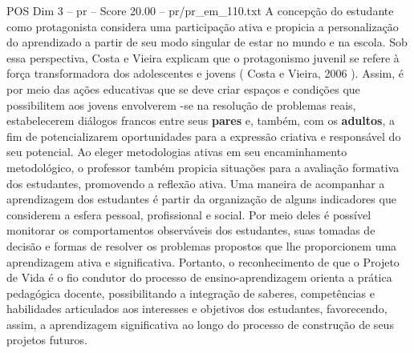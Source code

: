 \begin{textsample}{POS Dim 3 – pr – Score 20.00 – pr/pr\_em\_110.txt}
A concepção do estudante como protagonista considera uma participação ativa e propicia a personalização do aprendizado a partir de seu modo singular de estar no mundo e na escola.
Sob essa perspectiva, Costa e Vieira explicam que o protagonismo juvenil se refere à força transformadora dos adolescentes e jovens ( Costa e Vieira, 2006 ).
Assim, é por meio das ações educativas que se deve criar espaços e condições que possibilitem aos jovens envolverem -se na resolução de problemas reais, estabelecerem diálogos francos entre seus \textbf{pares} e, também, com os \textbf{adultos}, a fim de potencializarem oportunidades para a expressão criativa e responsável do seu potencial.
Ao eleger metodologias ativas em seu encaminhamento metodológico, o professor também propicia situações para a avaliação formativa dos estudantes, promovendo a reflexão ativa.
Uma maneira de acompanhar a aprendizagem dos estudantes é partir da organização de alguns indicadores que considerem a esfera pessoal, profissional e social.
Por meio deles é possível monitorar os comportamentos observáveis dos estudantes, suas tomadas de decisão e formas de resolver os problemas propostos que lhe proporcionem uma aprendizagem ativa e significativa.
Portanto, o reconhecimento de que o Projeto de Vida é o fio condutor do processo de ensino-aprendizagem orienta a prática pedagógica docente, possibilitando a integração de saberes, competências e habilidades articulados aos interesses e objetivos dos estudantes, favorecendo, assim, a aprendizagem significativa ao longo do processo de construção de seus projetos futuros.

\end{textsample}
